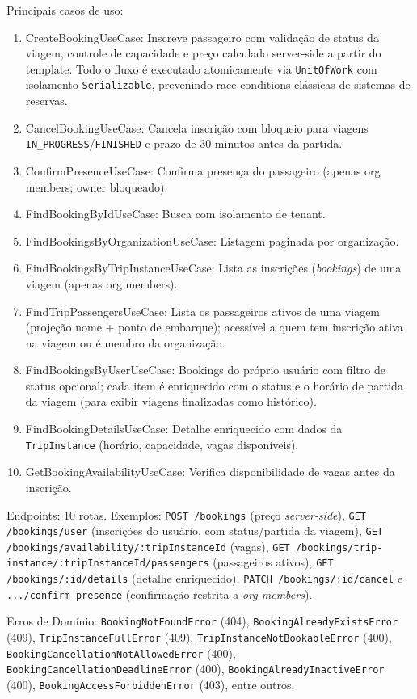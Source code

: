 Principais casos de uso:
\begin{enumerate}
\item CreateBookingUseCase: Inscreve passageiro com validação de status da viagem, controle de capacidade e preço calculado server-side a partir do template. Todo o fluxo é executado atomicamente via \texttt{UnitOfWork} com isolamento \texttt{Serializable}, prevenindo race conditions clássicas de sistemas de reservas.
\item CancelBookingUseCase: Cancela inscrição com bloqueio para viagens \texttt{IN\_PROGRESS}/\texttt{FINISHED} e prazo de 30 minutos antes da partida.
\item ConfirmPresenceUseCase: Confirma presença do passageiro (apenas org members; owner bloqueado).
\item FindBookingByIdUseCase: Busca com isolamento de tenant.
\item FindBookingsByOrganizationUseCase: Listagem paginada por organização.
\item FindBookingsByTripInstanceUseCase: Lista as inscrições (\textit{bookings}) de uma viagem (apenas org members).
\item FindTripPassengersUseCase: Lista os passageiros ativos de uma viagem (projeção nome + ponto de embarque); acessível a quem tem inscrição ativa na viagem ou é membro da organização.
\item FindBookingsByUserUseCase: Bookings do próprio usuário com filtro de status opcional; cada item é enriquecido com o status e o horário de partida da viagem (para exibir viagens finalizadas como histórico).
\item FindBookingDetailsUseCase: Detalhe enriquecido com dados da \texttt{TripInstance} (horário, capacidade, vagas disponíveis).
\item GetBookingAvailabilityUseCase: Verifica disponibilidade de vagas antes da inscrição.
\end{enumerate}

Endpoints: 10 rotas. Exemplos: \texttt{POST /bookings} (preço \textit{server-side}), \texttt{GET /bookings/user} (inscrições do usuário, com status/partida da viagem), \texttt{GET /bookings/availability/:tripInstanceId} (vagas), \texttt{GET /bookings/trip-instance/:tripInstanceId/passengers} (passageiros ativos), \texttt{GET /bookings/:id/details} (detalhe enriquecido), \texttt{PATCH /bookings/:id/cancel} e \texttt{.../confirm-presence} (confirmação restrita a \textit{org members}).

Erros de Domínio: \texttt{BookingNotFoundError} (404), \texttt{BookingAlreadyExistsError} (409), \texttt{TripInstanceFullError} (409), \texttt{TripInstanceNotBookableError} (400), \texttt{BookingCancellationNotAllowedError} (400), \texttt{BookingCancellationDeadlineError} (400), \texttt{BookingAlreadyInactiveError} (400), \texttt{BookingAccessForbiddenError} (403), entre outros.

